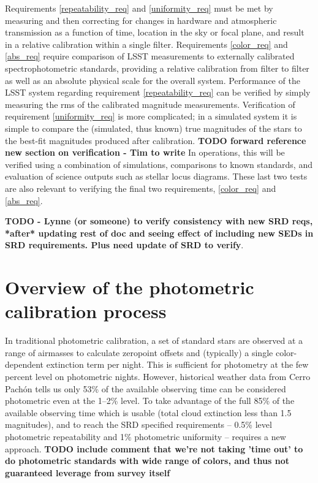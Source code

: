 \documentclass[12pt,preprint]{aastex}
\begin{document}
Requirements \ref{repeatability_req} and \ref{uniformity_req} must be
met by measuring and then correcting for changes in hardware and
atmospheric transmission as a function of time, location in the sky or
focal plane, and result in a relative calibration within a single
filter. Requirements \ref{color_req} and \ref{abs_req} require
comparison of LSST measurements to externally calibrated
spectrophotometric standards, providing a relative calibration from
filter to filter as well as an absolute physical scale for the overall
system.  Performance of the LSST system regarding requirement
\ref{repeatability_req} can be verified by simply measuring the rms of
the calibrated magnitude measurements. Verification of requirement
\ref{uniformity_req} is more complicated; in a simulated system it is
simple to compare the (simulated, thus known) true magnitudes of the
stars to the best-fit magnitudes produced after calibration. {\bf TODO forward reference new section on verification - Tim to write} 
In operations, this will be verified using a combination of simulations,
comparisons to known standards, and evaluation of science outputs such
as stellar locus diagrams. These last two tests are also relevant to
verifying the final two requirements, \ref{color_req} and
\ref{abs_req}.

{\bf TODO - Lynne (or someone) to verify consistency with new SRD reqs, *after* updating rest of doc and seeing effect of including new SEDs in SRD requirements. Plus need update of SRD to verify}. 


\section{Overview of the photometric calibration process}
\label{sec:calib_overview}

In traditional photometric calibration, a set of standard stars are
observed at a range of airmasses to calculate zeropoint offsets and
(typically) a single color-dependent extinction term per night. This is
sufficient for photometry at the few percent level on photometric
nights. However, historical weather data from Cerro Pach\'{o}n tells us
only 53\% of the available observing time can be considered
photometric even at the 1--2\% level. To take advantage of the full
85\% of the available observing time which is usable (total cloud
extinction less than 1.5 magnitudes), and to reach the SRD specified
requirements -- 0.5\% level photometric repeatability and 1\%
photometric uniformity -- requires a new approach.
{\bf TODO include comment that we're not taking 'time out' to do photometric standards with wide range of colors, and thus not guaranteed leverage from survey itself}
\end{document}
